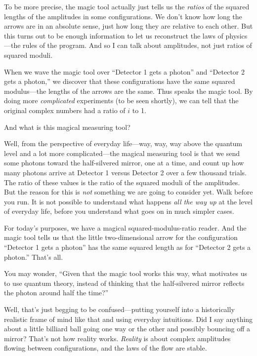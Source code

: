 {
 To be more precise, the magic tool actually just tells us the
\textit{ratios} of the squared lengths of the amplitudes in some
configurations. We don't know how long the arrows are
in an absolute sense, just how long they are relative to each other.
But this turns out to be enough information to let us reconstruct the
laws of physics---the rules of the program. And so I can talk about
amplitudes, not just ratios of squared moduli.}

{
 When we wave the magic tool over ``Detector 1
gets a photon'' and ``Detector 2
gets a photon,'' we discover that these
configurations have the same squared modulus---the lengths of the
arrows are the same. Thus speaks the magic tool. By doing more
\textit{complicated} experiments (to be seen shortly), we can tell that
the original complex numbers had a ratio of $i$ to 1.}

{
 And what is this magical measuring tool?}

{
 Well, from the perspective of everyday life---way, way, way above
the quantum level and a lot more complicated---the magical measuring
tool is that we send some photons toward the half-silvered mirror, one
at a time, and count up how many photons arrive at Detector 1 versus
Detector 2 over a few thousand trials. The ratio of these values is the
ratio of the squared moduli of the amplitudes. But the reason for this
is \textit{not} something we are going to consider yet. Walk before you
run. It is not possible to understand what happens \textit{all the way
up} at the level of everyday life, before you understand what goes on
in much simpler cases.}

{
 For today's purposes, we have a magical
squared-modulus-ratio reader. And the magic tool tells us that the
little two-dimensional arrow for the configuration
``Detector 1 gets a photon'' has the
same squared length as for ``Detector 2 gets a
photon.'' That's all.}

{
 You may wonder, ``Given that the magic tool works
this way, what motivates us to use quantum theory, instead of thinking
that the half-silvered mirror reflects the photon around half the
time?''}

{
 Well, that's just begging to be confused---putting
yourself into a historically realistic frame of mind like that and
using everyday intuitions. Did I say anything about a little billiard
ball going one way or the other and possibly bouncing off a mirror?
That's not how reality works. \textit{Reality} is about
complex amplitudes flowing between configurations, and the laws of the
flow are stable.}

